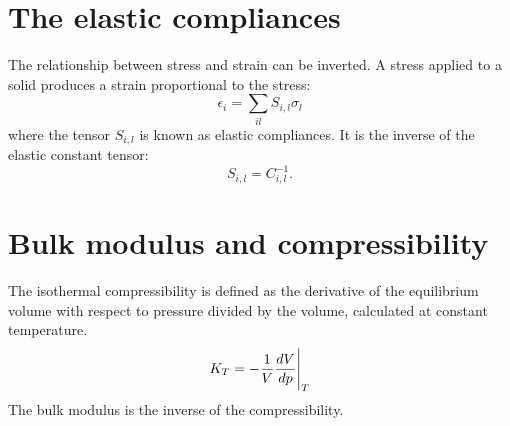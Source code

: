 \documentclass[12pt,a4paper]{article}
\begin{document}
%

\newpage
\section{\color{coral}The elastic compliances}
The relationship between stress and strain can be inverted. A stress 
applied to a solid produces a strain proportional to the stress:
\begin{equation}
\epsilon_{i} =\sum_{il} S_{i,l} \sigma_l 
\end{equation}
where the tensor $S_{i,l}$ is known as elastic compliances. It is the
inverse of the elastic constant tensor: 
\begin{equation}
S_{i,l} = C_{i,l}^{-1}.
\end{equation}


\newpage
\section{\color{coral}Bulk modulus and compressibility}

The isothermal compressibility is defined as the derivative of the 
equilibrium volume with respect to pressure divided by the volume,
calculated at constant temperature.
\begin{equation}
K_T = - {1 \over V} {d V \over d p}\Bigg|_T
\end{equation}
The bulk modulus is the inverse of the compressibility. 
\end{document}

